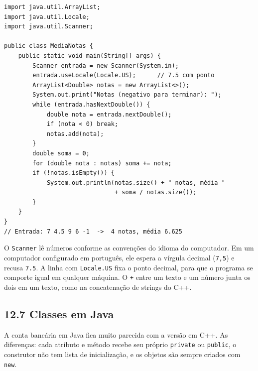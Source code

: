 \begin{codigo}
\begin{Verbatim}[breaklines=true, breaksymbolleft={}, fontsize=\footnotesize]
import java.util.ArrayList;
import java.util.Locale;
import java.util.Scanner;

public class MediaNotas {
    public static void main(String[] args) {
        Scanner entrada = new Scanner(System.in);
        entrada.useLocale(Locale.US);      // 7.5 com ponto
        ArrayList<Double> notas = new ArrayList<>();
        System.out.print("Notas (negativo para terminar): ");
        while (entrada.hasNextDouble()) {
            double nota = entrada.nextDouble();
            if (nota < 0) break;
            notas.add(nota);
        }
        double soma = 0;
        for (double nota : notas) soma += nota;
        if (!notas.isEmpty()) {
            System.out.println(notas.size() + " notas, média "
                               + soma / notas.size());
        }
    }
}
// Entrada: 7 4.5 9 6 -1  ->  4 notas, média 6.625
\end{Verbatim}
\end{codigo}

O \texttt{Scanner} lê números conforme as convenções do idioma do computador. Em um computador configurado em português, ele espera a vírgula decimal (\texttt{7,5}) e recusa \texttt{7.5}. A linha com \texttt{Locale.US} fixa o ponto decimal, para que o programa se comporte igual em qualquer máquina. O \texttt{+} entre um texto e um número junta os dois em um texto, como na concatenação de strings do C++.

\subsection{12.7 Classes em Java}

A conta bancária em Java fica muito parecida com a versão em C++. As diferenças: cada atributo e método recebe seu próprio \texttt{private} ou \texttt{public}, o construtor não tem lista de inicialização, e os objetos são sempre criados com \texttt{new}.

